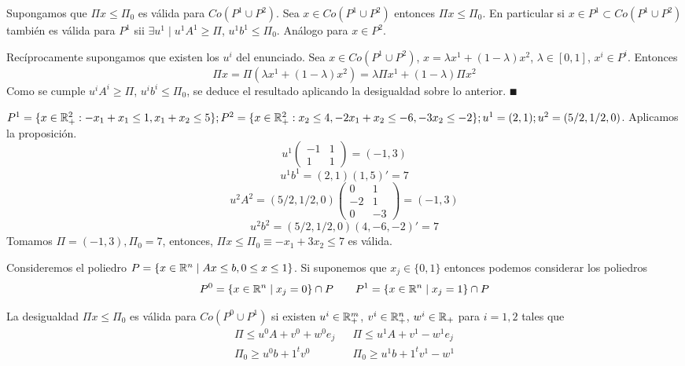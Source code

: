 \documentclass[MIOP.tex]{subfiles}
\begin{document}
\begin{dem}
Supongamos que $\Pi x \leq \Pi_0$ es válida para $ Co(P^1\cup P^2)$. Sea $x \in Co(P^1\cup P^2)$ entonces $\Pi x \leq \Pi_0$. En particular si $x\in P^1 \subset Co(P^1\cup P^2)$ también es válida para $P^1$ sii $\exists u^1\mid u^1 A^1 \geq \Pi$, $u^1 b^1 \leq \Pi_0$. Análogo para $x\in P^2$.

Recíprocamente supongamos que existen los $u^i$ del enunciado. Sea $x\in Co(P^1\cup P^2)$, $x=\lambda x^1 +(1-\lambda)x^2$, $\lambda \in [0,1]$, $x^i\in P^i$. Entonces 
$$
\Pi x = \Pi (\lambda x^1 +(1-\lambda)x^2) = \lambda \Pi x^1 +(1-\lambda)\Pi x^2
$$
Como se cumple $u^i A^i \geq \Pi$, $u^i b^i \leq \Pi_0$, se deduce el resultado aplicando la desigualdad sobre lo anterior. $\QED$
\end{dem}

\begin{ej}
$P^1=\{x\in\mathbb{R}^2_+:-x_1+x_1\leq 1, x_1+x_2\leq 5\}; P^2=\{x\in\mathbb{R}^2_+:x_2\leq 4,-2x_1+x_2\leq -6, -3x_2\leq -2\}; u^1=(2,1);u^2=(5/2,1/2,0)$. Aplicamos la  proposición. 
$$
u^1\begin{pmatrix}
-1 & 1\\
1 & 1
\end{pmatrix}=(-1,3)
$$
$$u^1b^1=(2,1)(1,5)'=7$$
$$u^2A^2=(5/2,1/2,0)\begin{pmatrix}
0 & 1\\
-2 & 1\\
0 & -3
\end{pmatrix}=(-1,3)$$
$$
u^2b^2=(5/2, 1/2,0)(4, -6,-2)'=7$$
Tomamos $\Pi=(-1,3), \Pi_0=7$, entonces, $\Pi x\leq\Pi_0\equiv -x_1+3x_2\leq 7$ es válida.
\end{ej}
Consideremos el poliedro $P=\{x\in\mathbb{R}^n \mid Ax\leq b, 0\leq x \leq 1\}$. Si suponemos que $x_j\in\{0,1\}$ entonces podemos considerar los poliedros 
$$P^0=\{x\in\mathbb{R}^n \mid x_j =0\}\cap P \qquad P^1 =\{x\in\mathbb{R}^n \mid x_j=1\}\cap P
$$
\begin{prop}
La desigualdad $\Pi x\leq \Pi_0$ es válida para $Co(P^0 \cup P^1)$ si existen $u^i \in \mathbb{R}^m_+$, $v^i \in \mathbb{R}^n_+$, $w^i\in\mathbb{R}_+$ para $i=1,2$ tales que 
\begin{align*}
\Pi\leq u^0A + v^0 + w^0e_j && \Pi \leq u^1 A + v^1-w^1 e_j\\
\Pi_0 \geq u^0b+1^tv^0 && \Pi_0\geq u^1 b +1^t v^1 -w^1
\end{align*}
\end{prop}
\end{document}
